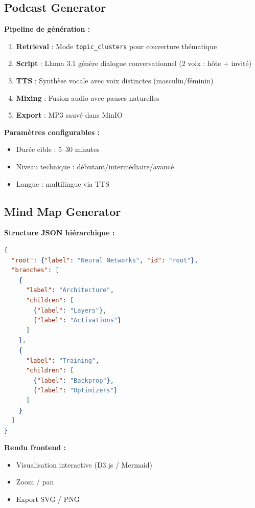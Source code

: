 \documentclass[12pt,a4paper]{article}
\begin{document}
\subsection{Podcast Generator}

\textbf{Pipeline de génération :}
\begin{enumerate}
    \item \textbf{Retrieval} : Mode \texttt{topic\_clusters} pour couverture thématique
    \item \textbf{Script} : Llama 3.1 génère dialogue conversationnel (2 voix : hôte + invité)
    \item \textbf{TTS} : Synthèse vocale avec voix distinctes (masculin/féminin)
    \item \textbf{Mixing} : Fusion audio avec pauses naturelles
    \item \textbf{Export} : MP3 sauvé dans MinIO
\end{enumerate}

\textbf{Paramètres configurables :}
\begin{itemize}
    \item Durée cible : 5--30 minutes
    \item Niveau technique : débutant/intermédiaire/avancé
    \item Langue : multilingue via TTS
\end{itemize}

\subsection{Mind Map Generator}

\textbf{Structure JSON hiérarchique :}
\begin{lstlisting}[language=json]
{
  "root": {"label": "Neural Networks", "id": "root"},
  "branches": [
    {
      "label": "Architecture",
      "children": [
        {"label": "Layers"},
        {"label": "Activations"}
      ]
    },
    {
      "label": "Training",
      "children": [
        {"label": "Backprop"},
        {"label": "Optimizers"}
      ]
    }
  ]
}
\end{lstlisting}

\textbf{Rendu frontend :}
\begin{itemize}
    \item Visualisation interactive (D3.js / Mermaid)
    \item Zoom / pan
    \item Export SVG / PNG
\end{itemize}
\end{document}
